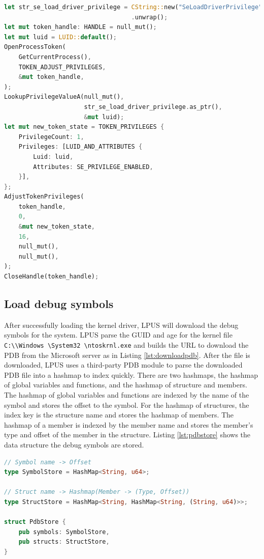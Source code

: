 \begin{lstlisting}[language=rust,caption={Enable SeLoadDriver},label={lst:seloaddriver},float,floatplacement=H]
let str_se_load_driver_privilege = CString::new("SeLoadDriverPrivilege")
                                   .unwrap();
let mut token_handle: HANDLE = null_mut();
let mut luid = LUID::default();
OpenProcessToken(
    GetCurrentProcess(),
    TOKEN_ADJUST_PRIVILEGES,
    &mut token_handle,
);
LookupPrivilegeValueA(null_mut(),
                      str_se_load_driver_privilege.as_ptr(),
                      &mut luid);
let mut new_token_state = TOKEN_PRIVILEGES {
    PrivilegeCount: 1,
    Privileges: [LUID_AND_ATTRIBUTES {
        Luid: luid,
        Attributes: SE_PRIVILEGE_ENABLED,
    }],
};
AdjustTokenPrivileges(
    token_handle,
    0,
    &mut new_token_state,
    16,
    null_mut(),
    null_mut(),
);
CloseHandle(token_handle);
\end{lstlisting}

\subsection[Load debug symbols]{Load debug symbols}

After successfully loading the kernel driver, LPUS will download the debug
symbols for the system. LPUS parse the GUID and age for the kernel file
\texttt{C:\textbackslash \textbackslash Windows \textbackslash System32
\textbackslash ntoskrnl.exe} and builds the URL to download the PDB from the
Microsoft server as in Listing \ref{lst:downloadpdb}. After the file is
downloaded, LPUS uses a third-party PDB module to parse the downloaded PDB file
into a hashmap to index quickly. There are two hashmaps, the hashmap of global
variables and functions, and the hashmap of structure and members. The hashmap
of global variables and functions are indexed by the name of the symbol and
stores the offset to the symbol. For the hashmap of structures, the index key
is the structure name and stores the hashmap of members. The hashmap of a
member is indexed by the member name and stores the member's type and offset of
the member in the structure. Listing \ref{lst:pdbstore} shows the data
structure the debug symbols are stored.

\begin{lstlisting}[language=rust,caption={Stores debug symbols},label={lst:pdbstore},float,floatplacement=H]
// Symbol name -> Offset
type SymbolStore = HashMap<String, u64>;

// Struct name -> Hashmap(Member -> (Type, Offset))
type StructStore = HashMap<String, HashMap<String, (String, u64)>>;

struct PdbStore {
    pub symbols: SymbolStore,
    pub structs: StructStore,
}
\end{lstlisting}

